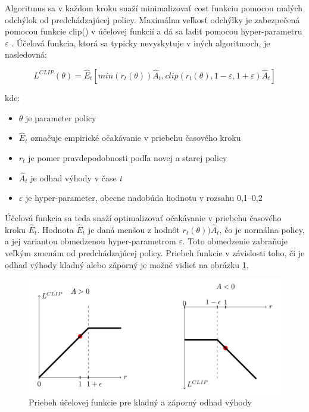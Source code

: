 \documentclass[slovak, master]{diploma}
\begin{document}
Algoritmus sa v každom kroku snaží minimalizovať cost funkciu pomocou malých odchýlok od predchádzajúcej policy. Maximálna veľkosť odchýlky je zabezpečená pomocou funkcie clip() v účelovej funkcií a dá sa ladiť pomocou hyper-parametru \(\varepsilon\) \cite{PPOPaper}. Účelová funkcia, ktorá sa typicky nevyskytuje v iných algoritmoch, je nasledovná:

\[L^{CLIP}(\theta) = \hat{E}_t [min(r_t(\theta))\hat{A}_t, clip(r_t(\theta), 1 - \varepsilon, 1 + \varepsilon)\hat{A}_t]\]

kde:
\begin{itemize}
  \item \(\theta\) je parameter policy
  \item \(\hat{E}_t\) označuje empirické očakávanie v priebehu časového kroku
  \item \(r_t\) je pomer pravdepodobnosti podľa novej a starej policy
  \item \(\hat{A}_t\) je odhad výhody v čase \textit{t}
  \item \(\varepsilon\) je hyper-parameter, obecne nadobúda hodnotu v rozsahu 0,1--0,2
\end{itemize}

Účelová funkcia sa teda snaží optimalizovať očakávanie v priebehu časového kroku \(\hat{E}_t\). Hodnota \(\hat{E}_t\) je daná menšou z hodnôt \(r_t(\theta))\hat{A}_t\), čo je normálna policy, a jej variantou obmedzenou hyper-parametrom \(\varepsilon\). Toto obmedzenie zabraňuje veľkým zmenám od predchádzajúcej policy. Priebeh funkcie v závislosti toho, či je odhad výhody kladný alebo záporný je možné vidieť na obrázku \ref{pic:clipping}.

\begin{figure}[!htbp]
    \centering
    \includegraphics[width=.7\textwidth]{Figures/clip.png}
    \caption{Priebeh účelovej funkcie pre kladný a záporný odhad výhody \cite{PPOPaper}}
    \label{pic:clipping}
\end{figure}

\end{document}
